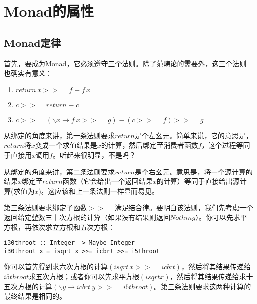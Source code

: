 \section{Monad的属性}
\subsection{Monad定律}
首先，要成为Monad，它必须遵守三个法则。除了范畴论的需要外，这三个法则也确实有意义：
\begin{enumerate}
\item $return\ x >>=  f \equiv f\ x$
\item $c >>= return \equiv c$
\item $c >>= (\backslash{}x \rightarrow f\ x >>= g) \equiv (c >>= f) >>= g$
\end{enumerate}

从绑定的角度来讲，第一条法则要求$return$是个左幺元。简单来说，它的意思是，$return$将$x$变成一个求值结果是$x$的计算，然后绑定至消费者函数$f$，这个过程等同于直接用$x$调用$f$。听起来很明显，不是吗？

从绑定的角度来讲，第二条法则要求$return$是个右幺元。意思是，将一个源计算的结果$x$绑定至$return$函数（它会给出一个返回结果$x$的计算）等同于直接给出源计算(求值为$x$)。这应该和上一条法则一样显而易见。

第三条法则要求绑定子函数$>>=$满足结合律。要明白该法则，我们先考虑一个返回给定整数三十次方根的计算（如果没有结果则返回$Nothing$）。你可以先求平方根，再依次求立方根和五次方根：

\begin{lstlisting}
i30throot :: Integer -> Maybe Integer
i30throot x = isqrt x >>= icbrt >>= i5throot
\end{lstlisting}

你可以首先得到求六次方根的计算$(isqrt\ x >>= icbrt)$，然后将其结果传递给$i5throot$求五次方根；或者你可以先求平方根$(isqrt x)$，然后将其结果传递给求十五次方根的计算$(\backslash{}y \rightarrow icbrt\ y >>= i5throot)$。第三条法则要求这两种计算的最终结果是相同的。
